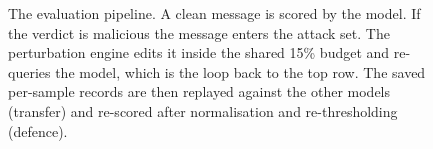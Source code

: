 \begin{figure}[t]
\centering

\caption{The evaluation pipeline. A clean message is scored by the model. If
the verdict is malicious the message enters the attack set. The perturbation
engine edits it inside the shared 15\% budget and re-queries the model, which
is the loop back to the top row. The saved per-sample records are then replayed
against the other models (transfer) and re-scored after normalisation and
re-thresholding (defence).}
\label{fig:pipeline}
\end{figure}
